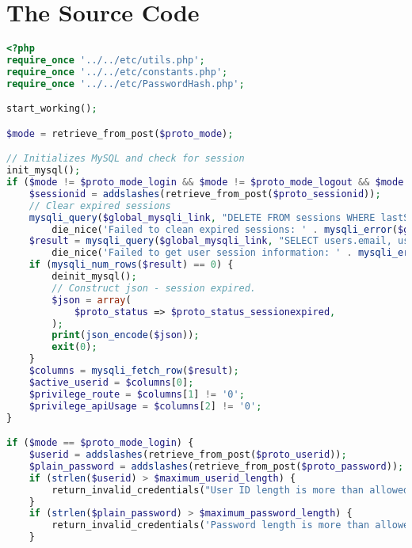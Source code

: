 \chapter{The Source Code}
\label{app:A}

\singlespacing 
%
%
\begin{lstlisting}[language=PHP,basicstyle=\tiny,caption=handle.php]
<?php
require_once '../../etc/utils.php';
require_once '../../etc/constants.php';
require_once '../../etc/PasswordHash.php';

start_working();

$mode = retrieve_from_post($proto_mode);

// Initializes MySQL and check for session
init_mysql();
if ($mode != $proto_mode_login && $mode != $proto_mode_logout && $mode != $proto_mode_register) {
	$sessionid = addslashes(retrieve_from_post($proto_sessionid));
	// Clear expired sessions
	mysqli_query($global_mysqli_link, "DELETE FROM sessions WHERE lastSeen < (NOW() - INTERVAL $session_expiry_interval_mysql)") or
		die_nice('Failed to clean expired sessions: ' . mysqli_error($global_mysqli_link), true);
	$result = mysqli_query($global_mysqli_link, "SELECT users.email, users.privilegeRoute, users.privilegeApiUsage FROM users LEFT JOIN sessions ON users.email = sessions.email WHERE sessions.sessionId = '$sessionid'") or
		die_nice('Failed to get user session information: ' . mysqli_error($global_mysqli_link), true);
	if (mysqli_num_rows($result) == 0) {
		deinit_mysql();
		// Construct json - session expired.
		$json = array(
			$proto_status => $proto_status_sessionexpired,
		);
		print(json_encode($json));
		exit(0);
	}
	$columns = mysqli_fetch_row($result);
	$active_userid = $columns[0]; 
	$privilege_route = $columns[1] != '0';
	$privilege_apiUsage = $columns[2] != '0';
}

if ($mode == $proto_mode_login) {
	$userid = addslashes(retrieve_from_post($proto_userid));
	$plain_password = addslashes(retrieve_from_post($proto_password));
	if (strlen($userid) > $maximum_userid_length) {
		return_invalid_credentials("User ID length is more than allowed (". strlen($userid) . ')');
	}
	if (strlen($plain_password) > $maximum_password_length) {
		return_invalid_credentials('Password length is more than allowed ('. strlen($password) . ')');
	}


\end{lstlisting}
